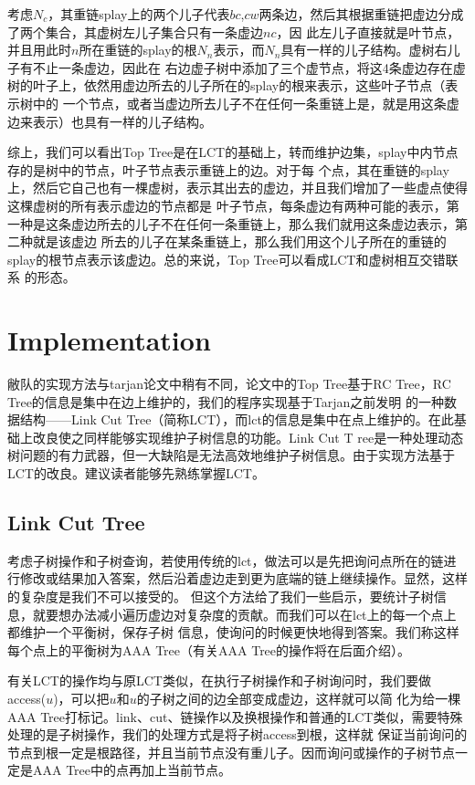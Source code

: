 ﻿\documentclass{article}
\begin{document}
		\indent 考虑$N_c$，其重链splay上的两个儿子代表$bc$,$cw$两条边，然后其根据重链把虚边分成了两个集合，其虚树左儿子集合只有一条虚边$nc$，因
		此左儿子直接就是叶节点，并且用此时$n$所在重链的splay的根$N_n$表示，而$N_n$具有一样的儿子结构。虚树右儿子有不止一条虚边，因此在
		右边虚子树中添加了三个虚节点，将这4条虚边存在虚树的叶子上，依然用虚边所去的儿子所在的splay的根来表示，这些叶子节点（表示树中的
		一个节点，或者当虚边所去儿子不在任何一条重链上是，就是用这条虚边来表示）也具有一样的儿子结构。\par
		\indent 综上，我们可以看出Top Tree是在LCT的基础上，转而维护边集，splay中内节点存的是树中的节点，叶子节点表示重链上的边。对于每
		个点，其在重链的splay上，然后它自己也有一棵虚树，表示其出去的虚边，并且我们增加了一些虚点使得这棵虚树的所有表示虚边的节点都是
		叶子节点，每条虚边有两种可能的表示，第一种是这条虚边所去的儿子不在任何一条重链上，那么我们就用这条虚边表示，第二种就是该虚边
		所去的儿子在某条重链上，那么我们用这个儿子所在的重链的splay的根节点表示该虚边。总的来说，Top Tree可以看成LCT和虚树相互交错联系
		的形态。
	\section{Implementation}
		敝队的实现方法与tarjan论文中稍有不同，论文中的Top Tree基于RC Tree，RC Tree的信息是集中在边上维护的，我们的程序实现基于Tarjan之前发明
		的一种数据结构——Link Cut Tree（简称LCT），而lct的信息是集中在点上维护的。在此基础上改良使之同样能够实现维护子树信息的功能\cite{ref3}\cite{ref4}。Link Cut T
		ree是一种处理动态树问题的有力武器，但一大缺陷是无法高效地维护子树信息。由于实现方法基于LCT的改良。建议读者能够先熟练掌握LCT。
		\subsection{Link Cut Tree}
		考虑子树操作和子树查询，若使用传统的lct，做法可以是先把询问点所在的链进行修改或结果加入答案，然后沿着虚边走到更为底端的链上继续操作。显然，这样的复杂度是我们不可以接受的。
		但这个方法给了我们一些启示，要统计子树信息，就要想办法减小遍历虚边对复杂度的贡献。而我们可以在lct上的每一个点上都维护一个平衡树，保存子树
		信息，使询问的时候更快地得到答案。我们称这样每个点上的平衡树为AAA Tree（有关AAA Tree的操作将在后面介绍）。\par
		\indent 有关LCT的操作均与原LCT类似，在执行子树操作和子树询问时，我们要做access($u$)，可以把$u$和$u$的子树之间的边全部变成虚边，这样就可以简
		化为给一棵AAA Tree打标记。link、cut、链操作以及换根操作和普通的LCT类似，需要特殊处理的是子树操作，我们的处理方式是将子树access到根，这样就
		保证当前询问的节点到根一定是根路径，并且当前节点没有重儿子。因而询问或操作的子树节点一定是AAA Tree中的点再加上当前节点。
\end{document}
